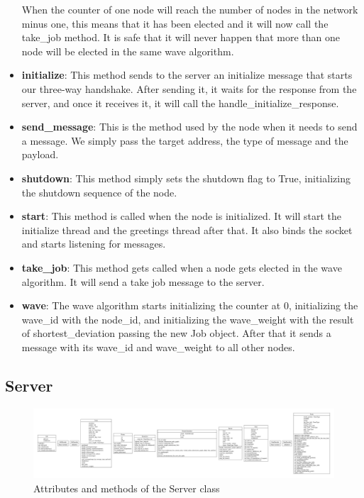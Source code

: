 \documentclass[titlepage]{article}
\begin{document}
\begin{itemize}
\begin{itemize}
    \end{itemize}
    When the counter of one node will reach the number of nodes in the network minus one, this means that it has been elected and it will now call the take\_job method. It is safe that it will never happen that more than one node will be elected in the same wave algorithm.
    \item \textbf{initialize}: This method sends to the server an initialize message that starts our three-way handshake. After sending it, it waits for the response from the server, and once it receives it, it will call the handle\_initialize\_response.
    \item \textbf{send\_message}: This is the method used by the node when it needs to send a message. We simply pass the target address, the type of message and the payload.
    \item \textbf{shutdown}: This method simply sets the shutdown flag to True, initializing the shutdown sequence of the node.
    \item \textbf{start}: This method is called when the node is initialized. It will start the initialize thread and the greetings thread after that. It also binds the socket and starts listening for messages.
    \item \textbf{take\_job}: This method gets called when a node gets elected in the wave algorithm. It will send a take job message to the server.
    \item \textbf{wave}: The wave algorithm starts initializing the counter at $0$, initializing the wave\_id with the node\_id, and initializing the wave\_weight with the result of shortest\_deviation passing the new Job object. After that it sends a message with its wave\_id and wave\_weight to all other nodes.
\end{itemize}

\subsection{Server}
\begin{figure}[H]
    \centering
    \includegraphics[trim={60.4cm 6cm 30cm 6cm}, clip, scale=.5]{img/classes.pdf}
    \caption{Attributes and methods of the Server class}
    \label{fig:server_class}
\end{figure}
\end{document}
